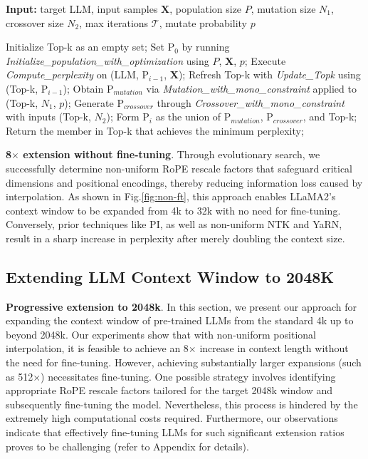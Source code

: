 \begin{algorithm}[t]
	\small
	\caption{The search algorithm}
	\textbf{Input:} target LLM, input samples $\mathbf{X}$,   population size $P$, mutation size $N_1$, crossover size $N_2$, max iterations $\mathcal{T}$, mutate probability $p$\\

	\begin{algorithmic}[1]
		\label{alg:search}
		\STATE Initialize Top-k as an empty set;	
		\STATE Set $\text{P}_0$ by running \textit{Initialize\_population\_with\_optimization} using $P$, $\mathbf{X}$, $p$; 
		\STATE Execute \textit{Compute\_perplexity} on (LLM, $\text{P}_{i-1}$, $\mathbf{X}$);
		\STATE  Refresh Top-k with \textit{Update\_Topk} using (Top-k, $\text{P}_{i-1}$);
		\STATE Obtain $\text{P}_{mutation}$ via \textit{Mutation\_with\_mono\_constraint} applied to (Top-k, $N_1$, $p$); 
		\STATE Generate $\text{P}_{crossover}$ through \textit{Crossover\_with\_mono\_constraint} with inputs (Top-k, $N_2$);
		\STATE Form $\text{P}_i$ as the union of $\text{P}_{mutation}$, $\text{P}_{crossover}$, and Top-k;
		\ENDFOR
		\STATE Return the member in Top-k that achieves the minimum perplexity;
	\end{algorithmic}
\end{algorithm}

\textbf{8$\times$ extension without fine-tuning}. Through evolutionary search, we successfully determine non-uniform RoPE rescale factors that safeguard critical dimensions and positional encodings, thereby reducing information loss caused by interpolation. As shown in Fig.\ref{fig:non-ft}, this approach enables LLaMA2's context window to be expanded from 4k to 32k with no need for fine-tuning. Conversely, prior techniques like PI, as well as non-uniform NTK and YaRN, result in a sharp increase in perplexity after merely doubling the context size.

\subsection{Extending LLM Context Window to 2048K}
\label{sec:extendto2048k}

\textbf{Progressive extension to 2048k}. In this section, we present our approach for expanding the context window of pre-trained LLMs from the standard 4k up to beyond 2048k. Our experiments show that with non-uniform positional interpolation, it is feasible to achieve an 8$\times$ increase in context length without the need for fine-tuning. However, achieving substantially larger expansions (such as 512$\times$) necessitates fine-tuning. One possible strategy involves identifying appropriate RoPE rescale factors tailored for the target 2048k window and subsequently fine-tuning the model. Nevertheless, this process is hindered by the extremely high computational costs required. Furthermore, our observations indicate that effectively fine-tuning LLMs for such significant extension ratios proves to be challenging (refer to Appendix for details).

